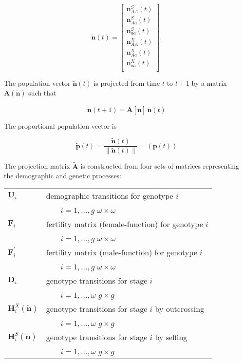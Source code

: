 \documentclass[11pt]{article}
\def\mbf#1{\mathbf{#1}}
\begin{document}
\begin{equation}
	\tilde{\mbf{n}}(t) =  \left[
								\begin{array}{c}
									\mbf{n}^{S}_{AA}(t) \\
									\mbf{n}^{S}_{Aa}(t) \\
									\mbf{n}^{S}_{aa}(t) \\ \hline
									\mbf{n}^{X}_{AA}(t) \\
									\mbf{n}^{X}_{Aa}(t) \\
									\mbf{n}^{X}_{aa}(t) \\ 
						\end{array} \right].
\end{equation}

\noindent The population vector $\tilde{\mbf{n}}(t)$ is projected from time $t$ to $t + 1$ by a matrix $\tilde{\mbf{A}}(\tilde{\mbf{n}})$ such that 

\begin{equation}
	\tilde{\mbf{n}}(t + 1) = \tilde{\mbf{A}}[\tilde{\mbf{n}}] \, \tilde{\mbf{n}}(t)
\end{equation}

\noindent The proportional population vector is

\begin{equation} \label{eq:propPopVec}
	\tilde{\mbf{p}}(t) = \frac{\tilde{\mbf{n}}(t)}{ \| \tilde{\mbf{n}}(t) \|} = \left( \mbf{p}(t) \right)
\end{equation}


The projection matrix $\tilde{\mbf{A}}$ is constructed from four sets of matrices representing the demographic and genetic processes:

\begin{table}[htbp]
\centering
\begin{tabular}{ l l } 
	$\mbf{U}_{i}$     & demographic transitions for genotype $i$ \\
				         &~~~ $i = 1, \ldots, g$ $\omega \times \omega$ \\
	$\mbf{F}_{i}$ & fertility matrix (female-function) for genotype $i$ \\
				         &~~~ $i = 1, \ldots, g$ $\omega \times \omega$ \\
	$\mbf{F}^{\prime}_{i}$ & fertility matrix (male-function) for genotype $i$ \\
				         &~~~ $i = 1, \ldots, g$ $\omega \times \omega$ \\
	$\mbf{D}_{i}$     & genotype transitions for stage $i$ \\
				         &~~~ $i = 1, \ldots, \omega$ $g \times g$	\\
	$\mbf{H}^X_{i}(\tilde{\mbf{n}})$ & genotype transitions for stage $i$ by outcrossing\\
				         &~~~ $i = 1, \ldots, \omega$ $g \times g$ \\	
	$\mbf{H}^S_{i}(\tilde{\mbf{n}})$ & genotype transitions for stage $i$ by selfing\\
				         &~~~ $i = 1, \ldots, \omega$ $g \times g$ \\	
\end{tabular}
\end{table}
\end{document}
